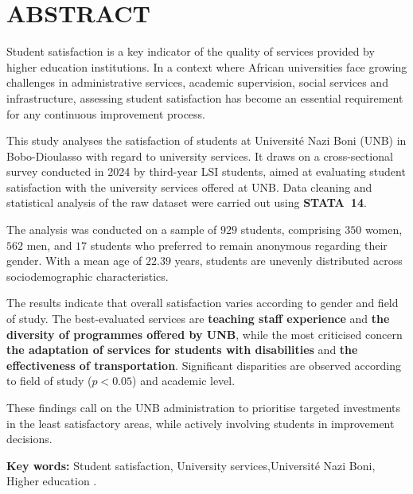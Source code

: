 \documentclass[
12pt,          %
a4paper,       %
oneside,      %
openright      %
]{report}          %
\begin{document}
				\cleardoublepage
		
		\chapter*{ABSTRACT}
		
		Student satisfaction is a key indicator of the quality
		of services provided by higher education institutions.
		In a context where African universities face growing
		challenges in administrative services, academic
		supervision, social services and infrastructure,
		assessing student satisfaction has become an essential
		requirement for any continuous improvement process.
		
		This study analyses the satisfaction of students at
		Universit\'e Nazi Boni (UNB) in Bobo-Dioulasso with
		regard to university services. It draws on a
		cross-sectional survey conducted in 2024 by third-year
		LSI students, aimed at evaluating student satisfaction
		with the university services offered at UNB. Data
		cleaning and statistical analysis of the raw dataset
		were carried out using \textbf{STATA~14}.
		
		The analysis was conducted on a sample of $929$
		students, comprising $350$ women, $562$ men, and $17$
		students who preferred to remain anonymous regarding
		their gender. With a mean age of $22.39$ years,
		students are unevenly distributed across
		sociodemographic characteristics.
		
		The results indicate that overall satisfaction varies
		according to gender and field of study. The
		best-evaluated services are \textbf{teaching staff
			experience} and \textbf{the diversity of programmes
			offered by UNB}, while the most criticised concern
		\textbf{the adaptation of services for students with
			disabilities} and \textbf{the effectiveness of
			transportation}. Significant disparities are observed
		according to field of study ($p < 0.05$) and academic
		level.
		
		These findings call on the UNB administration to
		prioritise targeted investments in the least
		satisfactory areas, while actively involving students
		in improvement decisions.
	
	\vspace{0.5cm}
	\noindent\textbf{Key words:} Student satisfaction,
	University services,Universit\'e 
	Nazi Boni, Higher education .
		
\end{document}
